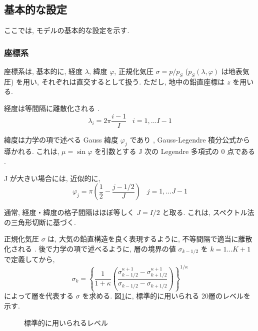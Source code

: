 ﻿
\subsection{基本的な設定}

ここでは, モデルの基本的な設定を示す.

\subsubsection{座標系}

座標系は, 基本的に,
経度 $\lambda$, 緯度 $\varphi$, 正規化気圧 $\sigma = p/p_S$ 
($p_S(\lambda,\varphi)$ は地表気圧)
を用い, それぞれは直交するとして扱う.
ただし, 地中の鉛直座標は $z$ を用いる.

経度は等間隔に離散化される .
\begin{equation}
  \lambda_i = 2 \pi \frac{i-1}{I}  \;\;\; i = 1, \ldots I-1
\end{equation}

緯度は力学の項で述べる Gauss 緯度 $\varphi_j$ であり ,
Gauss-Legendre 積分公式から導かれる.
これは, $\mu = \sin \varphi$ を引数とする
J 次の Legendre 多項式の 0 点である . 

J が大きい場合には, 近似的に,
\begin{equation}
  \varphi_j =  \pi ( \frac{1}{2}- \frac{j-1/2}{J} ) \;\;\; j = 1, \ldots J-1
\end{equation}

通常, 経度・緯度の格子間隔はほぼ等しく $J = I/2$ と取る. 
これは, スペクトル法の三角形切断に基づく.

正規化気圧 $\sigma$ は, 大気の鉛直構造を良く表現するように,
不等間隔で適当に離散化される .
後で力学の項で述べるように, 層の境界の値
$\sigma_{k-1/2}$ を $k = 1 \ldots K+1$ で定義してから,
%
\begin{equation}
 \sigma_k = \left\{ \frac{1}{1+\kappa}
                     \left( \frac{  \sigma^{\kappa +1}_{k-1/2}
                                  - \sigma^{\kappa +1}_{k+1/2}      }
                                  { \sigma_{k-1/2} - \sigma_{k+1/2} }
                     \right)
              \right\}^{1/\kappa}
\end{equation}
によって層を代表する $\sigma$ を求める.
図\ref{a-setup:level}に, 標準的に用いられる 20層のレベルを示す.

\begin{figure}[hbtp]
  \begin{center}
  \end{center}
  \caption{標準的に用いられるレベル}
  \label{a-setup:level}
\end{figure}

